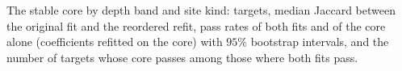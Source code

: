
\begin{table}[tbp]
\centering
\scriptsize
\caption{The stable core by depth band and site kind: targets, median Jaccard between the original fit and the reordered refit, pass rates of both fits and of the core alone (coefficients refitted on the core) with $95\%$ bootstrap intervals, and the number of targets whose core passes among those where both fits pass.}
\label{tab:run2026-stable-core-bands}
\end{table}
